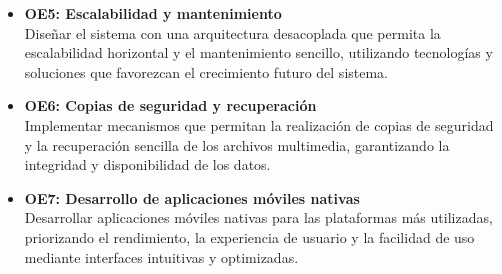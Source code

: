 \begin{itemize}
    \item \textbf{OE5: Escalabilidad y mantenimiento} \\
    Diseñar el sistema con una arquitectura desacoplada que permita la escalabilidad horizontal y el mantenimiento sencillo, utilizando tecnologías y soluciones que favorezcan el crecimiento futuro del sistema.

    \item \textbf{OE6: Copias de seguridad y recuperación} \\
    Implementar mecanismos que permitan la realización de copias de seguridad y la recuperación sencilla de los archivos multimedia, garantizando la integridad y disponibilidad de los datos.

    \item \textbf{OE7: Desarrollo de aplicaciones móviles nativas} \\
    Desarrollar aplicaciones móviles nativas para las plataformas más utilizadas, priorizando el rendimiento, la experiencia de usuario y la facilidad de uso mediante interfaces intuitivas y optimizadas.
\end{itemize}

